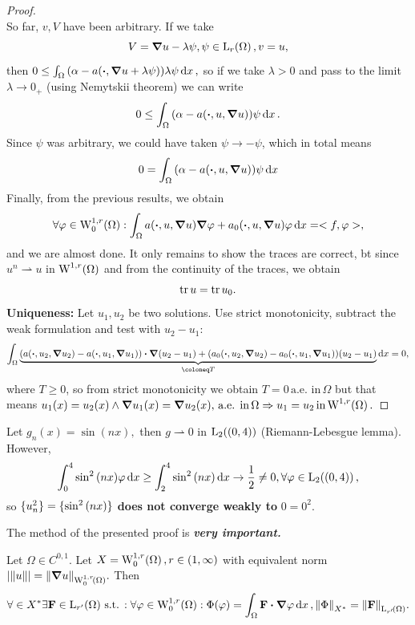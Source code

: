 \documentclass{article}
\begin{document}
\begin{proof}
\[	\]
	So far, $v,V$ have been arbitrary. If we take
	\[
		V = \grad u - \lambda \psi, \psi \in \LpSet[r]{\Omega}, v = u,
	\]
	then $ 0 \leq \int_{\Omega}\qty(\alpha - a\qty(\vdot, \grad u + \lambda \psi))\lambda \psi\dd{x}, $ so if we take $\lambda >0$ and pass to the limit $\lambda \to 0_+$ (using Nemytskii theorem) we can write
	\[
		0 \leq \int_{\Omega}\qty(\alpha - a\qty(\vdot, u, \grad u))\psi\dd{x}.
	\]
	Since $\psi$ was arbitrary, we could have taken $\psi \to - \psi$, which in total means
	\[
		0 = \int_{\Omega}\qty(\alpha - a\qty(\vdot, u, \grad u))\psi \dd{x}
	\]
	Finally, from the previous results, we obtain
	\[
		\forall \varphi \in \WkpzeroSet[1][r]{\Omega}: \int_{\Omega}a\qty(\vdot, u, \grad u)\grad \varphi+a_0\qty(\vdot, u, \grad u)\varphi\dd{x} = <f,\varphi>,
	\]
	and we are almost done. It only remains to show the traces are correct, bt since $u^n \rightharpoonup u$ in $\WkpSet[1][r]{\Omega}$ and from the continuity of the traces, we obtain
	\[
		\tr u = \tr u_0.
	\]
	\textbf{Uniqueness:} Let $u_1, u_2$ be two solutions. Use strict monotonicity, subtract the weak formulation and test with $u_2-u_1$:
	\[
		\int_{\Omega}\underbrace{\qty(a\qty(\vdot, u_2, \grad u_2)-a\qty(\vdot, u_1, \grad u_1))\vdot \grad\qty(u_2 - u_1)+\qty(a_0\qty(\vdot, u_2, \grad u_2)-a_0\qty(\vdot, u_1, \grad u_1))\qty(u_2-u_1)}_{\coloneq T}\dd{x} =0,
	\]
	where $T \geq 0$, so from strict monotonicity we obtain $T =0 \, \text{a.e. in} \, \Omega$ but that means $u_1(x) = u_2(x) \wedge \grad u_1(x) = \grad u_2 (x), \, \text{a.e. in} \, \Omega \Rightarrow u_1 = u_2 \, \text{in} \, \WkpSet[1][r]{\Omega}.$
\end{proof}
\begin{example}
	Let $g_n(x) = \sin(nx), $ then $g \rightharpoonup 0$ in $\LpSet[2]{(0,4)}$ (Riemann-Lebesgue lemma). However,
	\[
		\int_0^4 \sin^{2}\qty(nx)\varphi \dd{x} \geq \int_2^4 \sin^{2}\qty(nx)\dd{x} \to \frac{1}{2} \neq 0, \forall \varphi \in \LpSet[2]{(0,4)},
	\]
	so $\{u_n^{2}\} = \{\sin^{2}\qty(nx)\}$ \textbf{does not converge weakly to } $0 = 0^{2}$.
\end{example}
\begin{remark}
	The method of the presented proof is \textbf{\textit{very important.}}
\end{remark}
\begin{theorem}
	Let $\Omega \in C^{0,1}.$ Let $X = \WkpzeroSet[1][r]{\Omega}, r \in \qty(1,\infty)$ with equivalent norm $|\norm{u}| = \norm{\grad u}_{\WkpzeroSet[1][r]{\Omega}}.$ Then
	\[
		\forall \in X^{*} \exists \vb{F} \in \LpSet[r']{\Omega} \, \text{s.t.} \,: \forall \varphi \in \WkpzeroSet[1][r]{\Omega}: \Phi(\varphi) = \int_{\Omega}\vb{F} \vdot \grad \varphi\dd{x}, \norm{\Phi}_{X^{*}} = \norm{\vb{F}}_{\LpSet[r']{\Omega}}.
	\]
\end{theorem}
\end{document}
